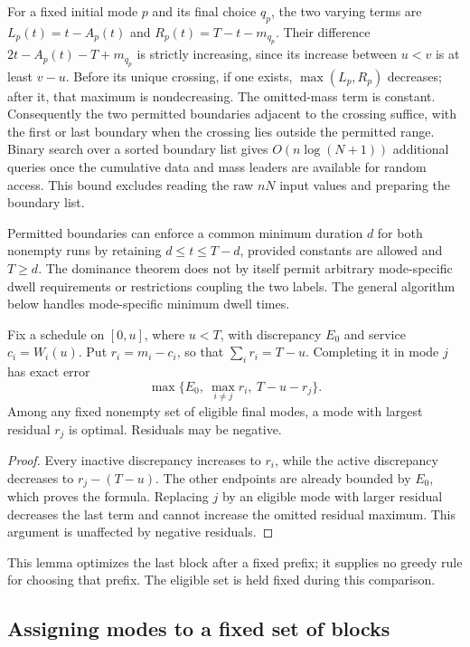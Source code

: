 For a fixed initial mode $p$ and its final choice $q_p$, the two varying
terms are $L_p(t)=t-A_p(t)$ and $R_p(t)=T-t-m_{q_p}$. Their difference
$2t-A_p(t)-T+m_{q_p}$ is strictly increasing, since its increase between
$u<v$ is at least $v-u$. Before its unique crossing, if one exists,
$\max(L_p,R_p)$ decreases; after it, that maximum is nondecreasing.
The omitted-mass term is constant. Consequently the two permitted boundaries
adjacent to the crossing suffice, with the first or last boundary when the
crossing lies outside the permitted range. Binary search over a sorted
boundary list gives $O(n\log(N+1))$ additional queries once the cumulative
data and mass leaders are available for random access. This bound excludes
reading the raw $nN$ input values and preparing the boundary list.

Permitted boundaries can enforce a common minimum duration $d$ for both
nonempty runs by retaining $d\le t\le T-d$, provided constants are allowed
and $T\ge d$. The dominance theorem does not by itself permit arbitrary
mode-specific dwell requirements or restrictions coupling the two labels.
The general algorithm below handles mode-specific minimum dwell times.

\begin{lemma}\label{lem:final-residual}
Fix a schedule on $[0,u]$, where $u<T$, with discrepancy $E_0$ and service
$c_i=W_i(u)$. Put $r_i=m_i-c_i$, so that $\sum_i r_i=T-u$.
Completing it in mode $j$ has exact error
\begin{equation}\label{eq:final-residual}
 \max\{E_0,\ \max_{i\ne j}r_i,\ T-u-r_j\}.
\end{equation}
Among any fixed nonempty set of eligible final modes, a mode with largest
residual $r_j$ is optimal. Residuals may be negative.
\end{lemma}
\begin{proof}
Every inactive discrepancy increases to $r_i$, while the active discrepancy
decreases to $r_j-(T-u)$. The other endpoints are already bounded by $E_0$,
which proves the formula. Replacing $j$ by an eligible mode with larger
residual decreases the last term and cannot increase the omitted residual
maximum. This argument is unaffected by negative residuals.
\end{proof}
This lemma optimizes the last block after a fixed prefix; it supplies no
greedy rule for choosing that prefix. The eligible set is held fixed during
this comparison.

\subsection{Assigning modes to a fixed set of blocks}

